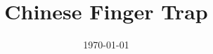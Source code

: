 \documentclass[letterpaper]{article}
\title{Chinese Finger Trap}
\author{}
\date{\today}
\begin{document}
\maketitle
\begin{multicols}{2}
%


\end{multicols}
\end{document}
